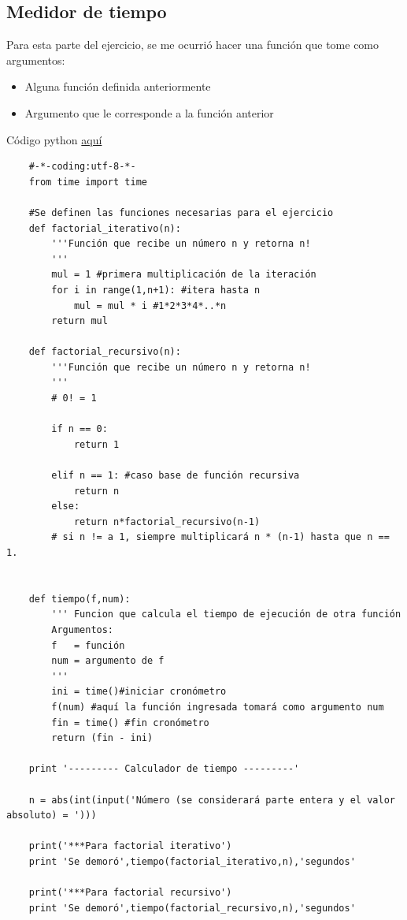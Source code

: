 \documentclass{article}
\begin{document}
\subsection{Medidor de tiempo}
Para esta parte del ejercicio, se me ocurrió hacer una función que tome como argumentos: 
\begin{itemize}
    \item Alguna función definida anteriormente
    \item Argumento que le corresponde a la función anterior 
\end{itemize}
Código python \href{https://github.com/joescalona/Programacion-Astronomica/blob/master/Tarea\%205/tiempo_factorial.py}{aquí}
    \begin{verbatim}
    #-*-coding:utf-8-*-
    from time import time
    
    #Se definen las funciones necesarias para el ejercicio 
    def factorial_iterativo(n):
        '''Función que recibe un número n y retorna n!
        '''
        mul = 1 #primera multiplicación de la iteración
        for i in range(1,n+1): #itera hasta n
            mul = mul * i #1*2*3*4*..*n
        return mul
    
    def factorial_recursivo(n):
    	'''Función que recibe un número n y retorna n!
    	''' 
    	# 0! = 1
    
    	if n == 0:
    		return 1
    	
    	elif n == 1: #caso base de función recursiva
    		return n
    	else:
    		return n*factorial_recursivo(n-1)
    	# si n != a 1, siempre multiplicará n * (n-1) hasta que n == 1. 
    
    
    def tiempo(f,num):
    	''' Funcion que calcula el tiempo de ejecución de otra función
    	Argumentos:
    	f   = función
    	num = argumento de f
    	'''
    	ini = time()#iniciar cronómetro
    	f(num) #aquí la función ingresada tomará como argumento num
    	fin = time() #fin cronómetro 
    	return (fin - ini) 
    
    print '--------- Calculador de tiempo ---------'
    
    n = abs(int(input('Número (se considerará parte entera y el valor absoluto) = ')))
    
    print('***Para factorial iterativo') 
    print 'Se demoró',tiempo(factorial_iterativo,n),'segundos'
    
    print('***Para factorial recursivo')
    print 'Se demoró',tiempo(factorial_recursivo,n),'segundos'
    \end{verbatim}
    
\end{document}
